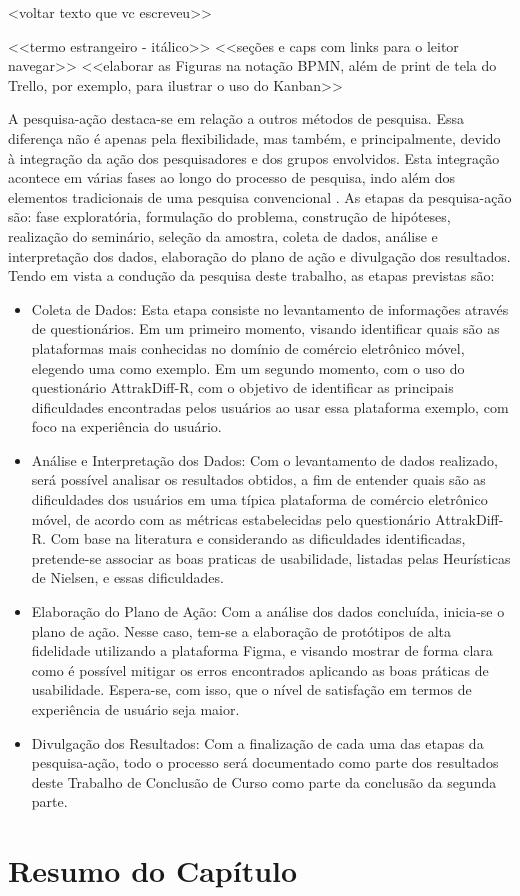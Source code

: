 <voltar texto que vc escreveu>>

<<termo estrangeiro - itálico>>
<<seções e caps com links para o leitor navegar>>
<<elaborar as Figuras na notação BPMN, além de print de tela do Trello, por exemplo, para ilustrar o uso do Kanban>>

A pesquisa-ação destaca-se em relação a outros métodos de pesquisa. Essa diferença não é apenas pela flexibilidade, mas também, e principalmente, devido à integração da ação dos pesquisadores e dos grupos envolvidos. Esta integração acontece em várias fases ao longo do processo de pesquisa, indo além dos elementos tradicionais de uma pesquisa convencional \cite{ProjPesquisaGil}. As etapas da pesquisa-ação são: fase exploratória, formulação do problema, construção de hipóteses, realização do seminário, seleção da amostra, coleta de dados, análise e interpretação dos dados, elaboração do plano de ação e divulgação dos resultados. Tendo em vista a condução da pesquisa deste trabalho, as etapas previstas são:

\begin{itemize}
    \item Coleta de Dados: Esta etapa consiste no levantamento de informações através de questionários. Em um primeiro momento, visando identificar quais são as plataformas mais conhecidas no domínio de comércio eletrônico móvel, elegendo uma como exemplo. Em um segundo momento, com o uso do questionário AttrakDiff-R, com o objetivo de identificar as principais dificuldades encontradas pelos usuários ao usar essa plataforma exemplo, com foco na experiência do usuário.
    \item Análise e Interpretação dos Dados: Com o levantamento de dados realizado, será possível analisar os resultados obtidos, a fim de entender quais são as dificuldades dos usuários em uma típica plataforma de comércio eletrônico móvel, de acordo com as métricas estabelecidas pelo questionário AttrakDiff-R. Com base na literatura e considerando as dificuldades identificadas, pretende-se associar as boas praticas de usabilidade, listadas pelas Heurísticas de Nielsen, e essas dificuldades.
    \item Elaboração do Plano de Ação: Com a análise dos dados concluída, inicia-se o plano de ação. Nesse caso, tem-se a elaboração de protótipos de alta fidelidade utilizando a plataforma Figma, e visando mostrar de forma clara como é possível mitigar os erros encontrados aplicando as boas práticas de usabilidade. Espera-se, com isso, que o nível de satisfação em termos de experiência de usuário seja maior.
    \item Divulgação dos Resultados: Com a finalização de cada uma das etapas da pesquisa-ação, todo o processo será documentado como parte dos resultados deste Trabalho de Conclusão de Curso como parte da conclusão da segunda parte.
\end{itemize}

\section{Resumo do Capítulo}


